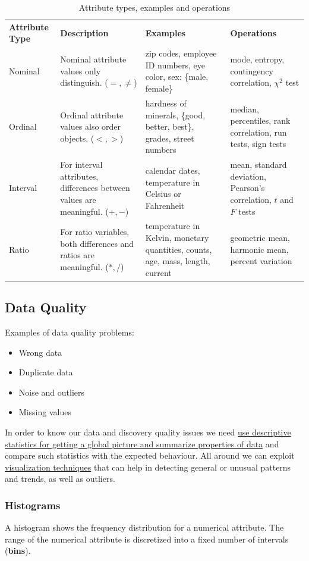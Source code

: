  \begin{table}[h!]
\centering
{}
\begin{tabular}{p{2.7cm}p{4.2cm}p{4.2cm}p{3.2cm}}
\rowcolor{cyan!30}
	\textbf{Attribute Type} & \textbf{Description} & \textbf{Examples} & \textbf{Operations} \\
Nominal & Nominal attribute values only distinguish. ($=, \neq$) & zip codes, employee ID numbers, eye color, sex: \{male, female\} & mode, entropy, contingency correlation, $\chi^2$ test \\
Ordinal & Ordinal attribute values also order objects. ($<, >$) & hardness of minerals, \{good, better, best\}, grades, street numbers & median, percentiles, rank correlation, run tests, sign tests \\
Interval & For interval attributes, differences between values are meaningful. ($+, -$) & calendar dates, temperature in Celsius or Fahrenheit & mean, standard deviation, Pearson's correlation, $t$ and $F$ tests \\
Ratio & For ratio variables, both differences and ratios are meaningful. ($*, /$) & temperature in Kelvin, monetary quantities, counts, age, mass, length, current & geometric mean, harmonic mean, percent variation \\
\end{tabular}
\caption{Attribute types, examples and operations}
\end{table}

\subsection{Data Quality}
Examples of data quality problems:
\begin{itemize}
	\item Wrong data
	\item Duplicate data
	\item Noise and outliers
	\item Missing values
\end{itemize}

In order to know our data and discovery quality issues
we need \ul{use descriptive statistics for getting a global picture and summarize properties of data} and
compare such statistics with the expected behaviour.
All around we can exploit \ul{visualization techniques} that can help in detecting general or unusual patterns and trends, as well as outliers.

\subsubsection{Histograms}
A histogram shows the frequency distribution for a numerical attribute.
The range of the numerical attribute is discretized into a fixed number of intervals (\textbf{bins}).

